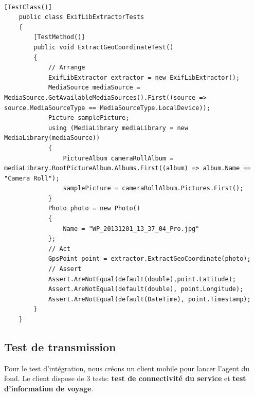 \documentclass{article}
\begin{document}
\begin{lstlisting}[label=Exemple de test unitaire,caption=Exemple de test unitaire]

[TestClass()]
    public class ExifLibExtractorTests
    {
        [TestMethod()]
        public void ExtractGeoCoordinateTest()
        {
            // Arrange
            ExifLibExtractor extractor = new ExifLibExtractor();
            MediaSource mediaSource = MediaSource.GetAvailableMediaSources().First((source => source.MediaSourceType == MediaSourceType.LocalDevice));
            Picture samplePicture;
            using (MediaLibrary mediaLibrary = new MediaLibrary(mediaSource))
            {
                PictureAlbum cameraRollAlbum = mediaLibrary.RootPictureAlbum.Albums.First((album) => album.Name == "Camera Roll");
                samplePicture = cameraRollAlbum.Pictures.First();
            }
            Photo photo = new Photo()
            {
                Name = "WP_20131201_13_37_04_Pro.jpg"
            };
            // Act
            GpsPoint point = extractor.ExtractGeoCoordinate(photo);
            // Assert
            Assert.AreNotEqual(default(double),point.Latitude);
            Assert.AreNotEqual(default(double), point.Longitude);
            Assert.AreNotEqual(default(DateTime), point.Timestamp);
        }
    }

\end{lstlisting}
\newpage
\subsection{\Large Test de transmission }
 
Pour le test d'intégration, nous créons un client mobile pour lancer l'agent du fond. Le client dispose de 3 tests: \textbf{test de connectivité du service} et \textbf{test d'information de voyage}. 

\vspace{0.2 cm}
\end{document}
